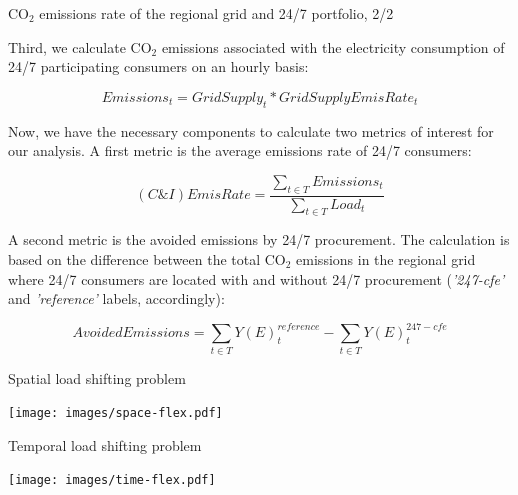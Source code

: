 \begin{frame}{CO$_2$ emissions rate of the regional grid and 24/7 portfolio, 2/2}

  {\small
  Third, we calculate {CO$_2$ emissions} associated with the electricity consumption of 
  24/7 participating consumers on an hourly basis:
  
  \begin{equation*}
  Emissions_t = GridSupply_t * GridSupplyEmisRate_t
  \end{equation*}

  Now, we have the necessary components to calculate two metrics of interest for our analysis. 
  A first metric is the \alert{average emissions rate of 24/7 consumers}:

  \begin{equation*}
    (C\&I)EmisRate = \frac{\sum_{t\in T} Emissions_t}{\sum_{t\in T} Load_t}
  \end{equation*}

  A second metric is the \alert{avoided emissions} by 24/7 procurement. The calculation is based on the 
  difference between the total {CO$_2$ emissions} in the regional grid where 24/7 consumers are located
  with and without 24/7 procurement (\emph{'247-cfe'} and \emph{'reference'} labels, accordingly):

  \begin{equation*}
    AvoidedEmissions = \sum_{t\in T} Y(E)_t^{reference} - \sum_{t\in T} Y(E)_t^{247-cfe}
  \end{equation*}
  }

\end{frame}




\begin{frame}{Spatial load shifting problem}

  \centering
  \texttt{[image: images/space-flex.pdf]}
  
\end{frame}

\begin{frame}{Temporal load shifting problem}

  \centering
  \texttt{[image: images/time-flex.pdf]}
  
\end{frame}



